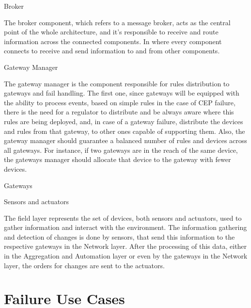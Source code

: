 \begin{Paragraph}{Broker}
	
	The broker component, which refers to a message broker, acts as the central point of the whole architecture, and it's responsible to receive and route information across the connected components. In where every component connects to receive and send information to and from other components.
	
\end{Paragraph}

\begin{Paragraph}{Gateway Manager}
	
	The gateway manager is the component responsible for rules distribution to gateways and fail handling. The first one, since gateways will be equipped with the ability to process events, based on simple rules in the case of CEP failure, there is the need for a regulator to distribute and be always aware where this rules are being deployed, and, in case of a gateway failure, distribute the devices and rules from that gateway, to other ones capable of supporting them. Also, the gateway manager should guarantee a balanced number of rules and devices across all gateways. For instance, if two gateways are in the reach of the same device, the gateways manager should allocate that device to the gateway with fewer devices.
	
	
\end{Paragraph}

\begin{Paragraph}{Gateways}
	
\end{Paragraph}

\begin{Paragraph}{Sensors and actuators}
	
	The field layer represents the set of devices, both sensors and actuators, used to gather information and interact with the environment. The information gathering and detection of changes is done by sensors, that send this information to the respective gateways in the Network layer. After the processing of this data, either in the Aggregation and Automation layer or even by the gateways in the Network layer, the orders for changes are sent to the actuators.
	
\end{Paragraph}


\section{Failure Use Cases}
\label{Architecture:usecases}

